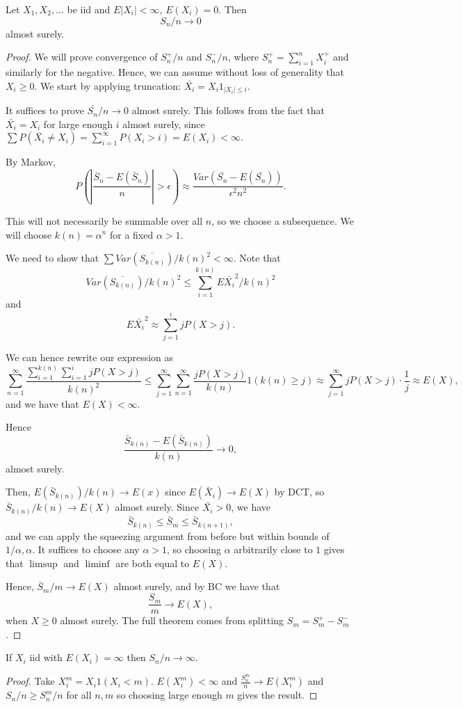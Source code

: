 \documentclass[11pt]{scrartcl}
\begin{document}
\begin{thm} Let $X_1, X_2, \dots$ be iid and $E|X_i| < \infty$, $E(X_i) = 0$.  Then
$$S_n/n \rightarrow 0$$
almost surely.
\end{thm}
\begin{proof}
We will prove convergence of $S_n^+/n$ and $S_n^-/n$, where $S_n^+ = \sum_{i=1}^n X_i^+$ and similarly for the negative.  Hence, we can assume without loss of generality that $X_i \ge 0$.  We start by applying truncation: $\bar{X_i} = X_i 1_{|X_i| \le i}.$  

It suffices to prove $\bar{S_n}/n \rightarrow 0$ almost surely.  This follows from the fact that $\bar{X_i} = X_i$ for large enough $i$ almost surely, since $\sum P(\bar{X_i} \ne X_i) = \sum_{i=1}^\infty P(X_i > i) = E(X_i) < \infty.$  

By Markov,
$$P\left ( \left|\frac{\overline S_n - E(\bar S_n)}{n}\right|> \epsilon\right) \approx \frac{Var(\bar{S_n} - E(\bar{S_n}))}{\epsilon^2 n^2}.$$

This will not necessarily be summable over all $n$, so we choose a subsequence.  We will choose $k(n) = \alpha^n$ for a fixed $\alpha > 1$.  

We need to show that $\sum Var(\overline{S_{k(n)}})/k(n)^2 < \infty$.  Note that 
$$Var(\overline{S_{k(n)}})/k(n)^2 \le \sum_{i=1}^{k(n)} E \bar{X_i}^2/k(n)^2$$
and $$E\bar{X_i}^2 \approx \sum_{j=1}^i jP(X> j).$$ 

We can hence rewrite our expression as 
$$\sum_{n=1}^{\infty} \frac{\sum_{i=1}^{k(n)} \sum_{i=1}^i jP(X > j)}{k(n)^2}\le \sum_{j=1}^{\infty} \sum_{n=1}^{\infty} \frac{jP(X > j)}{k(n)}1(k(n) \ge j) \approx \sum_{j=1}^{\infty} jP(X > j) \cdot \frac{1}{j} \approx E(X),$$
and we have that $E(X) < \infty$.

Hence 
$$\frac{\bar{S}_{k(n)} - E(\bar{S}_{k(n)})}{k(n)} \rightarrow 0,$$
almost surely.

Then, $E(\bar{S}_{k(n)})/k(n) \rightarrow E(x)$ since $E(\bar{X}_i) \rightarrow E(X)$ by DCT, so $\bar{S}_{k(n)}/k(n) \rightarrow E(X)$ almost surely.  Since $\bar{X_i} > 0$, we have 
$$\bar{S}_{k(n)} \le \bar{S}_m \le \bar{S}_{k(n+1)},$$
and we can apply the squeezing argument from before but within bounds of $1/\alpha, \alpha$.  It suffices to choose any $\alpha > 1$, so choosing $\alpha$ arbitrarily close to $1$ gives that $\limsup$ and $\liminf$ are both equal to $E(X)$.

Hence,
$\bar{S}_m/m \rightarrow E(X)$
almost surely, and by BC we have that $$\frac{S_m}{m} \rightarrow E(X),$$
when $X\ge 0$ almost surely.  The full theorem comes from splitting $S_m = S_m^+ - S_m^-$.
\end{proof}
\begin{corollary} If $X_i$ iid with $E(X_i) = \infty$ then $S_n/n \rightarrow \infty$.  
\end{corollary}
\begin{proof}
Take $X_i^m = X_i 1(X_i < m).$  $E(X_i^m) < \infty$ and $\frac{S_n^m}{n} \rightarrow E(X_i^m)$ and $S_n/n \ge S_n^m/n$ for all $n, m$ so choosing large enough $m$ gives the result.
\end{proof}
\end{document}
